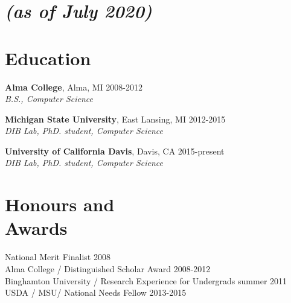 \documentclass[margin,12pt]{camille_resume}
\begin{document}
\address{{\bf Permanent Address}\\
By Request\\
Davis, CA}
\address{
\hfill {\bf Contact}\\
\hfill camille.scott.w@gmail.com\\
\hfill cswel@ucdavis.edu}
\pagestyle{plain}

    
\begin{resume}



\section{\small \it{(as of July 2020)}}

    \section{\mysidestyle Education}

{\bf Alma College}, Alma, MI \hfill 2008-2012\\
{\em B.S., Computer Science}

\vspace{1mm}

{\bf Michigan State University}, East Lansing, MI \hfill 2012-2015\\
{\em DIB Lab, PhD. student, Computer Science}

\vspace{1mm}

{\bf University of California Davis}, Davis, CA \hfill 2015-present\\
{\em DIB Lab, PhD. student, Computer Science}

\vspace{2mm}

    \section{\mysidestyle Honours and\\Awards} 

National Merit Finalist \hfill 2008\\
Alma College / Distinguished Scholar Award \hfill 2008-2012\\
Binghamton University / Research Experience for Undergrads \hfill summer 2011\\
USDA / MSU/  National Needs Fellow \hfill 2013-2015\\


\end{resume}
\end{document}
